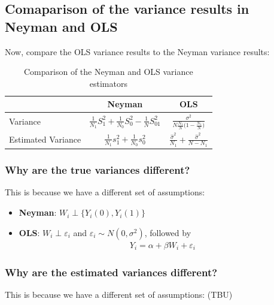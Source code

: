 \subsection{Comaparison of the variance results in Neyman and OLS}

Now, compare the OLS variance results to the Neyman variance results:

\begin{table}[h]
    \centering
    {\renewcommand{\arraystretch}{1.5}
    \begin{tabular}{lcc}
        \hline
        & Neyman & OLS \\
        \hline
        Variance & $\frac{1}{N_1}S_1^2 + \frac{1}{N_0}S_0^2 - \frac{1}{N}S_{01}^2$ & $\frac{\sigma^2}{N\frac{N_1}{N}\bigl(1-\frac{N_1}{N}\bigr)}$ \\
        Estimated Variance & $\frac{1}{N_1}s_1^2 + \frac{1}{N_0}s_0^2$ & $\frac{\hat\sigma^2}{N_1} + \frac{\hat\sigma^2}{N-N_1}$ \\
        \hline
    \end{tabular}
    }
    \caption{Comparison of the Neyman and OLS variance estimators}
\end{table}


\subsubsection{Why are the true variances different?}

This is because we have a different set of assumptions:

\begin{itemize}
    \item \textbf{Neyman}: $W_i \perp \{Y_i(0), Y_i(1)\}$
    \item \textbf{OLS}: $W_i \perp \varepsilon_i$ and $\varepsilon_i \sim N(0, \sigma^2)$, followed by
    \begin{align*}
        Y_i = \alpha + \beta W_i + \varepsilon_i
    \end{align*}
\end{itemize}



\subsubsection{Why are the estimated variances different?}

This is because we have a different set of assumptions: (TBU)